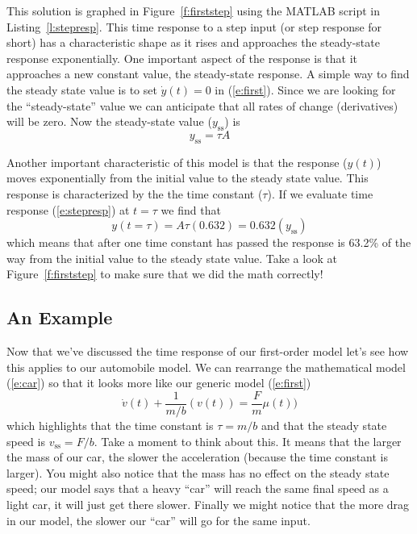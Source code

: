 This solution is graphed in Figure~\ref{f:firststep} using the MATLAB script in Listing~\ref{l:stepresp}. This time response to a step input (or step response for short) has a characteristic shape as it rises and approaches the \gls{steady-state response} exponentially.  One important aspect of the response is that it approaches a new constant value, the steady-state response.  A simple way to find the steady state value is to set $\dot{y}(t)=0$ in (\ref{e:first}).  Since we are looking for the ``steady-state'' value we can anticipate that all rates of change (derivatives) will be zero.  Now the steady-state value ($y_{\mathrm{ss}}$) is 
\begin{equation}\label{e:ss}
y_{\mathrm{ss}} = \tau A
\end{equation}

Another important characteristic of this model is that the response ($y(t)$) moves exponentially from the initial value to the steady state value.  This response is characterized by the the \gls{time constant} ($\tau$).  If we evaluate time response (\ref{e:stepresp}) at $t=\tau$ we find that
\[
y(t=\tau) = A \tau (0.632) = 0.632 (y_{\mathrm{ss}})
\]
which means that after one time constant has passed the response is 63.2\% of the way from the initial value to the steady state value.  Take a look at Figure~\ref{f:firststep} to make sure that we did the math correctly!

\subsection{An Example}
Now that we've discussed the time response of our first-order model let's see how this applies to our automobile model.  We can rearrange the mathematical model (\ref{e:car}) so that it looks more like our generic model (\ref{e:first})
\begin{equation}\label{e:car2}
\dot{v}(t) + \frac{1}{m/b}(v(t)) = \frac{F}{m}\mu(t))
\end{equation}
which highlights that the time constant is $\tau=m/b$ and that the steady state speed is $v_{\mathrm{ss}}=F/b$.  Take a moment to think about this.  It means that the larger the mass of our car, the slower the acceleration (because the time constant is larger).  You might also notice that the mass has no effect on the steady state speed; our model says that a heavy ``car'' will reach the same final speed as a light car, it will just get there slower.  Finally we might notice that the more drag in our model, the slower our ``car'' will go for the same input.   

